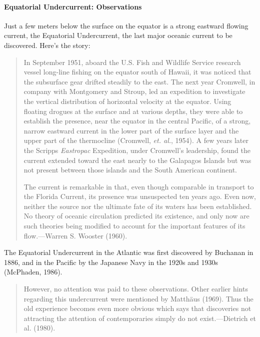 \paragraph{Equatorial Undercurrent: Observations}
Just a few meters below the surface on the equator is
a strong eastward flowing current, the Equatorial Undercurrent, the last major oceanic current
to be discovered. Here's the story:
\begin{quotation} \small
In September 1951, aboard the U.S. Fish and Wildlife Service research vessel
long-line fishing on the equator south of Hawaii, it was noticed that the
subsurface gear drifted steadily to the east. The next year Cromwell, in
company with Montgomery and Stroup, led an expedition to investigate the
vertical distribution of horizontal velocity at the equator. Using floating
drogues at the surface and at various depths, they were able to establish the
presence, near the equator in the central Pacific, of a strong, narrow eastward
current in the lower part of the surface layer and the upper part of the
thermocline (Cromwell, \textit{et. al.}, 1954). A few years later the
Scripps
\textit{Eastropac} Expedition, under Cromwell's leadership, found the current
extended toward the east nearly to the Galapagos Islands but was not present
between those islands and the South American continent.

The current is remarkable in that, even though comparable in transport to the Florida Current, its presence was unsuspected ten years ago.
Even now, neither the source nor the ultimate fate of its waters has been established. No
theory of oceanic circulation predicted its existence, and only now are such theories
being modified to account for the important features of its flow.---Warren S.
Wooster (1960).
\end{quotation}

The Equatorial Undercurrent in the Atlantic was first discovered by Buchanan in 1886, and in
the Pacific by the Japanese Navy in the 1920s and 1930s (McPhaden, 1986).
\begin{quote} \small
However, no attention was paid to these observations. Other earlier hints regarding this
undercurrent were mentioned by Matth\"{a}us (1969). Thus the old experience
becomes even more obvious which says that discoveries not attracting the
attention of contemporaries simply do not exist.---Dietrich et al. (1980).
\end{quote}

